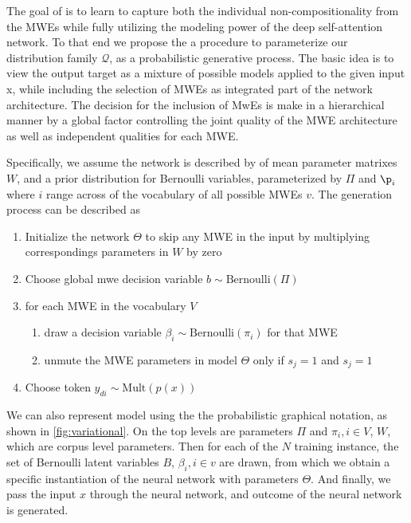 The goal of \BertMWE is to learn to capture both the individual non-compositionality from the MWEs while fully utilizing the modeling power of the deep self-attention network. 
To that end we propose the a procedure to parameterize our distribution family $\mathcal{Q}$, 
as a probabilistic generative process. 
The basic idea is to view the output target as a mixture of possible models applied to the given input x, 
while including the selection of MWEs as integrated part of the network architecture.
The decision for the inclusion of MwEs is make in a hierarchical manner by a global factor controlling the joint quality of the MWE architecture as well as independent qualities for each MWE.

Specifically, we assume the network is described by of mean parameter matrixes $W$, and a prior distribution for Bernoulli variables, parameterized by $\Pi$ and $\p_i$ where $i$ range across of the vocabulary of all possible MWEs $v$. The generation process can be described as
\begin{enumerate}
    \item Initialize the network $\Theta$ to skip any MWE in the input by multiplying correspondings parameters in $W$ by zero
    \item Choose global mwe decision variable 
        $b \sim \mbox{Bernoulli}(\Pi)$
    \item{for each MWE in the vocabulary $V$}
    \begin{enumerate}
        \item draw a decision variable $\beta_i \sim \mbox{Bernoulli}(\pi_i)$ for that MWE 
        \item{unmute the MWE parameters in model $\Theta$ only if $s_{j}=1$ and $s_{j}=1$}
    \end{enumerate}
    \item{Choose token $y_{di} \sim \mbox{Mult}(p(x))$}
\end{enumerate}


We can also represent \BertMWE model using the the probabilistic graphical notation, as shown in \autoref{fig:variational}. 
On the top levels are parameters $\Pi$ and $\pi_i, i \in V$, $W$, which are corpus level parameters. Then for each of the $N$ training instance, the set of Bernoulli latent variables
$B$, $\beta_i, i\in v$ are drawn, from which we obtain a specific instantiation of the neural network with parameters $\Theta$. And finally, we pass the input $x$ through the neural network, and outcome of the neural network is generated.


